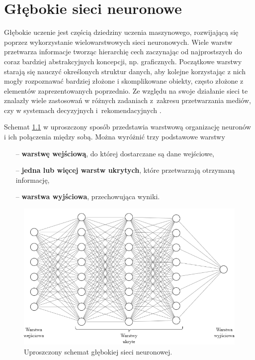 \chapter{Głębokie sieci neuronowe}
\label{roz2}

\hspace{0.4cm}
Głębokie uczenie jest częścią dziedziny uczenia maszynowego, rozwijającą się poprzez wykorzystanie wielowarstwowych sieci neuronowych. Wiele warstw przetwarza informacje tworząc hierarchię cech zaczynając od najprostszych do coraz bardziej abstrakcyjnych koncepcji, np. graficznych. Początkowe warstwy starają się nauczyć określonych struktur danych, aby kolejne korzystając z nich mogły rozpoznawać bardziej złożone i skomplikowane obiekty, często złożone z elementów zaprezentowanych poprzednio.
Ze względu na swoje działanie sieci te znalazły wiele zastosowań w różnych zadaniach z~zakresu przetwarzania mediów, czy w systemach decyzyjnych i~rekomendacyjnych \cite{OsowskiSieci}.

Schemat \ref{fig:schematsieci} w uproszczony sposób przedstawia warstwową organizację neuronów i ich połączenia między sobą. Można wyróżnić trzy podstawowe warstwy

\begin{itemize}
    \item[--] \textbf{warstwę wejściową}, do której dostarczane są dane wejściowe,
    \item[--] \textbf{jedna lub więcej warstw ukrytych}, które przetwarzają otrzymaną informację,
    \item[--] \textbf{warstwa wyjściowa}, przechowująca wyniki.
\end{itemize}

\begin{figure}[H]
    \centering
    \includegraphics[width=0.9\linewidth]{Obrazy/Rozdzial02/schematsieci.png}
    \caption{Uproszczony schemat głębokiej sieci neuronowej.}
    \label{fig:schematsieci}
\end{figure}


